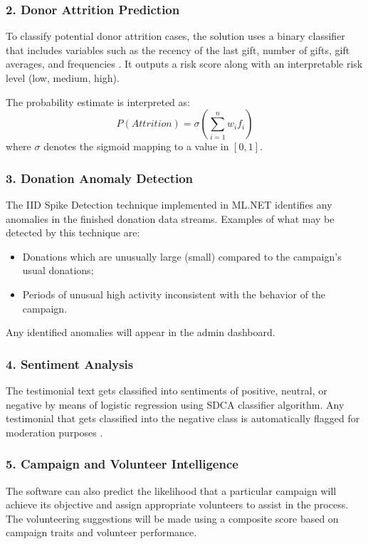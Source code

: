 \documentclass{thesis-library}
\begin{document}
\subsubsection{2. Donor Attrition Prediction}
To classify potential donor attrition cases, the solution uses a binary classifier that includes variables such as the recency of the last gift, number of gifts, gift averages, and frequencies \cite{gupta2020donor}. It outputs a risk score along with an interpretable risk level (low, medium, high).

The probability estimate is interpreted as:
\begin{equation}
    P(Attrition) = \sigma\!\left(\sum_{i=1}^{n} w_i f_i\right)
\end{equation}
where $\sigma$ denotes the sigmoid mapping to a value in $[0,1]$.

\subsubsection{3. Donation Anomaly Detection}
The IID Spike Detection technique implemented in ML.NET identifies any anomalies in the finished donation data streams. Examples of what may be detected by this technique are:
\begin{itemize}
    \item Donations which are unusually large (small) compared to the campaign’s usual donations;
    \item Periods of unusual high activity inconsistent with the behavior of the campaign.
\end{itemize}
Any identified anomalies will appear in the admin dashboard.

\subsubsection{4. Sentiment Analysis}
The testimonial text gets classified into sentiments of positive, neutral, or negative by means of logistic regression using SDCA classifier algorithm. Any testimonial that gets classified into the negative class is automatically flagged for moderation purposes \cite{hutto2014vader}.

\subsubsection{5. Campaign and Volunteer Intelligence}
The software can also predict the likelihood that a particular campaign will achieve its objective and assign appropriate volunteers to assist in the process. The volunteering suggestions will be made using a composite score based on campaign traits and volunteer performance.
\end{document}
